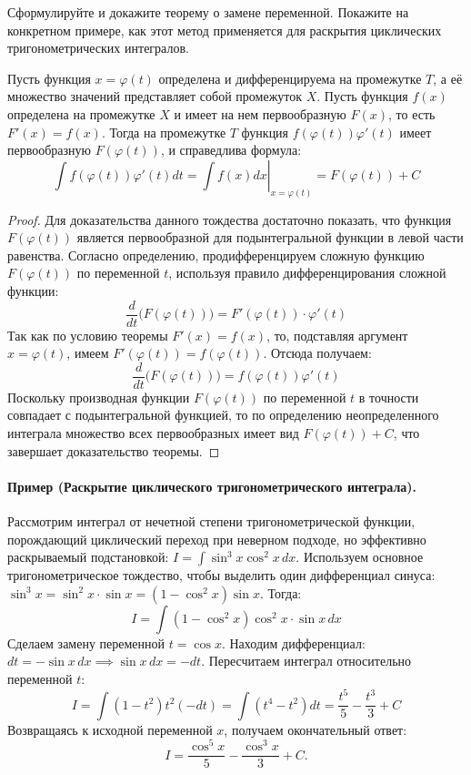 {Сформулируйте и докажите теорему о замене переменной. Покажите на конкретном примере, как этот метод применяется для раскрытия циклических тригонометрических интегралов.}

\begin{theorem}
Пусть функция $x = \varphi(t)$ определена и дифференцируема на промежутке $T$, а её множество значений представляет собой промежуток $X$. Пусть функция $f(x)$ определена на промежутке $X$ и имеет на нем первообразную $F(x)$, то есть $F'(x) = f(x)$. Тогда на промежутке $T$ функция $f(\varphi(t))\varphi'(t)$ имеет первообразную $F(\varphi(t))$, и справедлива формула:
$$ \int f(\varphi(t)) \varphi'(t) dt = \left. \int f(x) dx \right|_{x = \varphi(t)} = F(\varphi(t)) + C $$
\end{theorem}

\begin{proof}
Для доказательства данного тождества достаточно показать, что функция $F(\varphi(t))$ является первообразной для подынтегральной функции в левой части равенства. Согласно определению, продифференцируем сложную функцию $F(\varphi(t))$ по переменной $t$, используя правило дифференцирования сложной функции:
$$ \frac{d}{dt} \Big( F(\varphi(t)) \Big) = F'(\varphi(t)) \cdot \varphi'(t) $$
Так как по условию теоремы $F'(x) = f(x)$, то, подставляя аргумент $x = \varphi(t)$, имеем $F'(\varphi(t)) = f(\varphi(t))$. Отсюда получаем:
$$ \frac{d}{dt} \Big( F(\varphi(t)) \Big) = f(\varphi(t)) \varphi'(t) $$
Поскольку производная функции $F(\varphi(t))$ по переменной $t$ в точности совпадает с подынтегральной функцией, то по определению неопределенного интеграла множество всех первообразных имеет вид $F(\varphi(t)) + C$, что завершает доказательство теоремы.
\end{proof}

\paragraph{Пример (Раскрытие циклического тригонометрического интеграла).}
Рассмотрим интеграл от нечетной степени тригонометрической функции, порождающий циклический переход при неверном подходе, но эффективно раскрываемый подстановкой: $I = \int \sin^3 x \cos^2 x \, dx$.
Используем основное тригонометрическое тождество, чтобы выделить один дифференциал синуса: $\sin^3 x = \sin^2 x \cdot \sin x = (1 - \cos^2 x)\sin x$. Тогда:
$$ I = \int (1 - \cos^2 x)\cos^2 x \cdot \sin x \, dx $$
Сделаем замену переменной $t = \cos x$. Находим дифференциал: $dt = -\sin x \, dx \implies \sin x \, dx = -dt$. Пересчитаем интеграл относительно переменной $t$:
$$ I = \int (1 - t^2)t^2 (-dt) = \int (t^4 - t^2) dt = \frac{t^5}{5} - \frac{t^3}{3} + C $$
Возвращаясь к исходной переменной $x$, получаем окончательный ответ:
$$ I = \frac{\cos^5 x}{5} - \frac{\cos^3 x}{3} + C. $$

